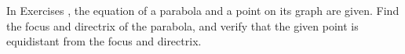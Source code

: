{\noindent In Exercises}
{, the equation of a parabola and a point on its graph are given. Find the focus and directrix of the parabola, and verify that the given point is equidistant from the focus and directrix.
}
